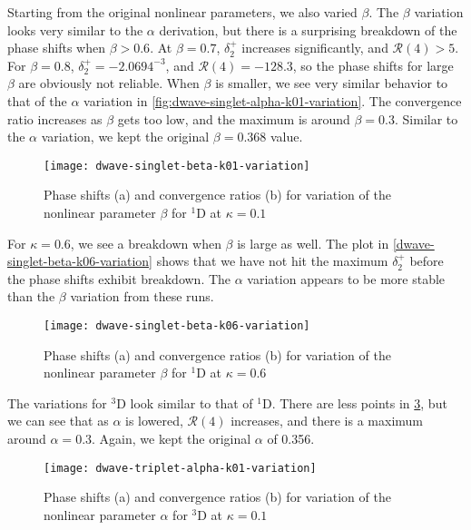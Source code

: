 \documentclass[Dissertation.tex]{subfiles}
\begin{document}
Starting from the original nonlinear parameters, we also varied $\beta$. The
$\beta$ variation looks very similar to the $\alpha$ derivation, but there is
a surprising breakdown of the phase shifts when $\beta > 0.6$. At $\beta = 0.7$,
$\delta_2^+$ increases significantly, and $\mathcal{R}(4) > 5$. For $\beta = 0.8$,
$\delta_2^+ = -2.0694^{-3}$, and $\mathcal{R}(4) = -128.3$, so the phase shifts
for large $\beta$ are obviously not reliable. When $\beta$ is smaller, we see
very similar behavior to that of the $\alpha$ variation in
\cref{fig:dwave-singlet-alpha-k01-variation}. The convergence ratio increases as
$\beta$ gets too low, and the maximum is around $\beta = 0.3$. Similar to the
$\alpha$ variation, we kept the original $\beta = 0.368$ value.

\begin{figure}[H]
	\centering
	\texttt{[image: dwave-singlet-beta-k01-variation]}
	\caption[Variation of the nonlinear parameter $\beta$ for $^{1}$D at $\kappa = 0.1$]{Phase shifts (a) and convergence ratios (b) for variation of the nonlinear parameter $\beta$ for $^{1}$D at $\kappa = 0.1$}
	\label{fig:dwave-singlet-beta-k01-variation}
\end{figure}

For $\kappa = 0.6$, we see a breakdown when $\beta$ is large as well. The plot
in \cref{dwave-singlet-beta-k06-variation} shows that we have not hit the maximum
$\delta_2^+$ before the phase shifts exhibit breakdown. The $\alpha$ variation
appears to be more stable than the $\beta$ variation from these runs.

\begin{figure}[H]
	\centering
	\texttt{[image: dwave-singlet-beta-k06-variation]}
	\caption[Variation of the nonlinear parameter $\beta$ for $^{1}$D at $\kappa = 0.6$]{Phase shifts (a) and convergence ratios (b) for variation of the nonlinear parameter $\beta$ for $^{1}$D at $\kappa = 0.6$}
	\label{fig:dwave-singlet-beta-k06-variation}
\end{figure}

The variations for $^3$D look similar to that of $^1$D. There are less points
in \cref{fig:dwave-triplet-alpha-k01-variation}, but we can see that as
$\alpha$ is lowered, $\mathcal{R}(4)$ increases, and there is a maximum around
$\alpha = 0.3$. Again, we kept the original $\alpha$ of 0.356.

\begin{figure}[H]
	\centering
	\texttt{[image: dwave-triplet-alpha-k01-variation]}
	\caption[Variation of the nonlinear parameter $\alpha$ for $^{3}$D at $\kappa = 0.1$]{Phase shifts (a) and convergence ratios (b) for variation of the nonlinear parameter $\alpha$ for $^{3}$D at $\kappa = 0.1$}
	\label{fig:dwave-triplet-alpha-k01-variation}
\end{figure}
\end{document}
